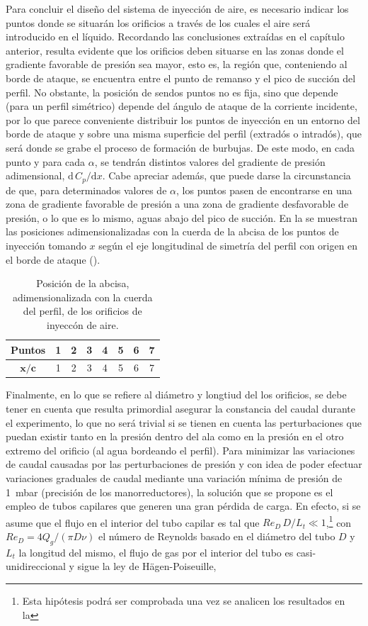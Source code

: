 Para concluir el diseño del sistema de inyección de aire, es necesario indicar los puntos donde se situarán los orificios a través de los cuales el aire será introducido en el líquido. Recordando las conclusiones extraídas en el capítulo anterior, resulta evidente que los orificios deben situarse en las zonas donde el gradiente favorable de presión sea mayor, esto es, la región que, conteniendo al borde de ataque, se encuentra entre el punto de remanso y el pico de succión del perfil. No obstante, la posición de sendos puntos no es fija, sino que depende (para un perfil simétrico) depende del ángulo de ataque de la corriente incidente, por lo que parece conveniente distribuir los puntos de inyección en un entorno del borde de ataque y sobre una misma superficie del perfil (extradós o intradós), que será donde se grabe el proceso de formación de burbujas. De este modo, en cada punto y para cada $\alpha$, se tendrán distintos valores del gradiente de presión adimensional, $\mathrm{d}\,C_{p}/\mathrm{d}x$. Cabe apreciar además, que puede darse la circunstancia de que, para determinados valores de $\alpha$, los puntos pasen de encontrarse en una zona de gradiente favorable de presión a una zona de gradiente desfavorable de presión, o lo que es lo mismo, aguas abajo del pico de succión. En la  se muestran las posiciones adimensionalizadas con la cuerda de la abcisa de los puntos de inyección tomando $x$ según el eje longitudinal de simetría del perfil con origen en el borde de ataque ().


\begin{table}
\centering
\begin{tabular}{c || c c c c c c c}
\textbf{Puntos} &1&2&3&4&5&6&7 \\
\hline \hline
$\mathbf{x/c}$ & 1 &2 &3 &4 &5 &6 &7 \\
\end{tabular}
\caption{Posición de la abcisa, adimensionalizada con la cuerda del perfil, de los orificios de inyeccón de aire.}
\end{table}

Finalmente, en lo que se refiere al diámetro y longtiud del los orificios, se debe tener en cuenta que resulta primordial asegurar la constancia del caudal durante el experimento, lo que no será trivial si se tienen en cuenta las perturbaciones que puedan existir tanto en la presión dentro del ala como en la presión en el otro extremo del orificio (al agua bordeando el perfil). Para minimizar las variaciones de caudal causadas por las perturbaciones de presión y con idea de poder efectuar variaciones graduales de caudal mediante una variación mínima de presión de 1~mbar (precisión de los manorreductores), la solución que se propone es el empleo de tubos capilares que generen una gran pérdida de carga. En efecto, si se asume que el flujo en el interior del tubo capilar es tal que $Re_{D}\,D/L_{t} \ll 1$,\footnote{Esta hipótesis podrá ser comprobada una vez se analicen los resultados en la } con $Re_{D} =  4Q_{g}/\left(\pi D \nu \right)$ el número de Reynolds basado en el diámetro del tubo $D$ y $L_{t}$ la longitud del mismo, el flujo de gas por el interior del tubo es casi-unidireccional y sigue la ley de Hägen-Poiseuille,

